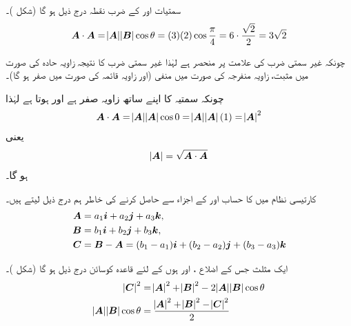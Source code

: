 سمتیات  اور  کے ضرب نقطہ درج ذیل ہو گا (شکل )۔
\begin{align*}
{\ensuremath{{\boldsymbol{A}}}}\cdot{\ensuremath{{\boldsymbol{A}}}}=\abs{{{\boldsymbol{A}}}}\abs{{{\boldsymbol{B}}}}\cos\theta=(3)(2)\cos\frac{\pi}{4}=6\cdot\frac{\sqrt{2}}{2}=3\sqrt{2}
\end{align*}

چونکہ غیر سمتی ضرب کی علامت  پر منحصر ہے لہٰذا غیر سمتی ضرب کا نتیجہ زاویہ حادہ کی صورت میں مثبت، زاویہ منفرجہ کی صورت میں  منفی (اور زاویہ قائمہ کی صورت میں صفر ہو گا)۔

چونکہ سمتیہ  کا اپنے ساتھ زاویہ صفر ہے  اور  ہوتا ہے لہٰذا
\begin{align*}
{\ensuremath{{\boldsymbol{A}}}}\cdot {\ensuremath{{\boldsymbol{A}}}}=\abs{{{\boldsymbol{A}}}}\abs{{{\boldsymbol{A}}}}\cos 0=\abs{{{\boldsymbol{A}}}}\abs{{{\boldsymbol{A}}}}(1)=\abs{{{\boldsymbol{A}}}}^2
\end{align*}
یعنی
\begin{align}
\abs{{{\boldsymbol{A}}}}=\sqrt{{{\boldsymbol{A}}}\cdot {\ensuremath{{\boldsymbol{A}}}}}
\end{align}
ہو گا۔

کارتیسی نظام میں  کا حساب  اور  کے اجزاء سے حاصل کرنے کی خاطر ہم درج ذیل لیتے ہیں۔
\begin{align*}
{\ensuremath{{\boldsymbol{A}}}}&=a_1{\boldsymbol{i}}+a_2{\boldsymbol{j}}+a_3{\boldsymbol{k}},\\
{{\boldsymbol{B}}}&=b_1{\boldsymbol{i}}+b_2{\boldsymbol{j}}+b_3{\boldsymbol{k}},\\
{{\boldsymbol{C}}}&={{\boldsymbol{B}}}-{{\boldsymbol{A}}}=(b_1-a_1){\boldsymbol{i}}+(b_2-a_2){\boldsymbol{j}}+(b_3-a_3){\boldsymbol{k}}
\end{align*}

ایک مثلث جس کے اضلاع ،  اور  ہوں کے لئے قاعدہ کوسائن درج ذیل ہو گا (شکل )۔
\begin{align*}
\abs{{{\boldsymbol{C}}}}^2&=\abs{{{\boldsymbol{A}}}}^2+\abs{{{\boldsymbol{B}}}}^2-2\abs{{{\boldsymbol{A}}}}\abs{{{\boldsymbol{B}}}}\cos\theta\\
\abs{{{\boldsymbol{A}}}}\abs{{{\boldsymbol{B}}}}\cos\theta&=\frac{\abs{{{\boldsymbol{A}}}}^2+\abs{{{\boldsymbol{B}}}}^2-\abs{{{\boldsymbol{C}}}}^2}{2}
\end{align*} 

